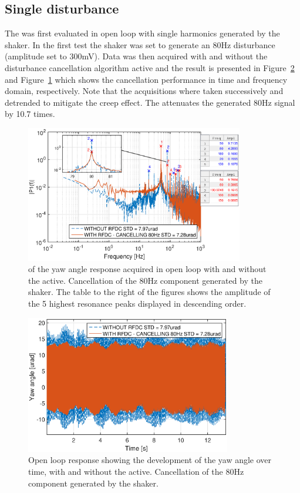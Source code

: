 \subsection{Single disturbance}
The \abbrRFDC was first evaluated in open loop with single harmonics generated by the shaker. In the first test the shaker was set to generate an 80Hz disturbance (amplitude set to 300mV). Data was then acquired with and without the disturbance cancellation algorithm active and the result is presented in Figure~\ref{fig:yl_openloop_80} and Figure~\ref{fig:fft_openloop_80} which shows the cancellation performance in time and frequency domain, respectively. Note that the acquisitions where taken successively and detrended to mitigate the creep effect. The \abbrRFDC attenuates the generated 80Hz signal by 10.7 times.

\begin{figure}[h!]
  \centering %
  \includegraphics[width=0.85\textwidth, trim=0cm 0cm 0cm 0cm, clip=true]{fig/matlab/fft_openloop_ext_disturbance_80Hz_with_zoom}
  \caption{\label{fig:fft_openloop_80} \abbrFFT of the yaw angle response acquired in open loop with and without the \abbrRFDC active. Cancellation of the 80Hz component generated by the shaker. The table to the right of the figures shows the amplitude of the 5 highest resonance peaks displayed in descending order.}
\end{figure}

\begin{figure}[h!]
  \centering %
  \includegraphics[width=0.8\textwidth, trim=0cm 0cm 0cm 0.7cm, clip=true]{fig/matlab/yl_openloop_ext_disturbance_80Hz}
  \caption{\label{fig:yl_openloop_80} Open loop response showing the development of the yaw angle over time, with and without the \abbrRFDC active. Cancellation of the 80Hz component generated by the shaker.}
\end{figure}

